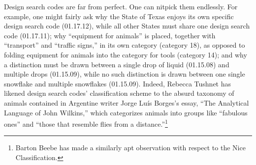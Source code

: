 \documentclass[letterpaper, 11pt, oneside]{article}
\begin{document}
Design search codes are far from perfect. One can nitpick them endlessly. For example, one might fairly ask why the State of Texas enjoys its own specific design search code (01.17.12), while all other States must share one design search code (01.17.11); why ``equipment for animals'' is placed, together with ``transport'' and ``traffic signs,'' in its own category (category 18), as opposed to folding equipment for animals into the category for tools (category 14); and why a distinction must be drawn between a single drop of liquid (01.15.08) and multiple drops (01.15.09), while no such distinction is drawn between one single snowflake and multiple snowflakes (01.15.09). Indeed, Rebecca Tushnet has likened design search codes' classification scheme to the absurd taxonomy of animals contained in Argentine writer Jorge Luís Borges's essay, ``The Analytical Language of John Wilkins,'' which categorizes animals into groups like ``fabulous ones'' and ``those that resemble flies from a distance.''\footnote{Barton Beebe has made a similarly apt observation with respect to the Nice Classification.}
\end{document}
